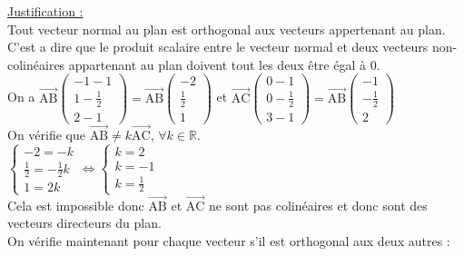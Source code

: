 \documentclass[a4paper, 12pt]{article}
\begin{document}
\noindent
\underline{Justification :}
\\
Tout vecteur normal au plan est orthogonal aux vecteurs appertenant au plan. 
C'est a dire que le produit scalaire entre le vecteur normal et deux vecteurs non-colinéaires appartenant au plan doivent tout les deux être égal à 0.
\\
On a $\overrightarrow{\text{AB}}\begin{pmatrix}-1-1\\1-\frac{1}{2} \\ 2-1\end{pmatrix} = \overrightarrow{\text{AB}}\begin{pmatrix} -2 \\ \frac{1}{2} \\ 1\end{pmatrix}$ et 
$\overrightarrow{\text{AC}}\begin{pmatrix} 0-1 \\ 0- \frac{1}{2} \\ 3-1 \end{pmatrix} = \overrightarrow{\text{AB}}\begin{pmatrix} -1 \\ -\frac{1}{2} \\ 2 \end{pmatrix}$
\\
On vérifie que $\overrightarrow{\text{AB}} \neq k\overrightarrow{\text{AC}}$, $\forall k \in \mathds{R}$.
\\
$\begin{cases} -2 = -k \\ \frac{1}{2} = -\frac{1}{2}k \\ 1 = 2k \end{cases} \iff \begin{cases}k = 2 \\ k = -1 \\ k = \frac{1}{2} \end{cases}$ 
\\
Cela est impossible donc $\overrightarrow{\text{AB}}$ et $\overrightarrow{\text{AC}}$ ne sont pas colinéaires et donc sont des vecteurs directeurs du plan. 
\\
On vérifie maintenant pour chaque vecteur s'il est orthogonal aux deux autres :
\vspace{3mm}
\end{document}

